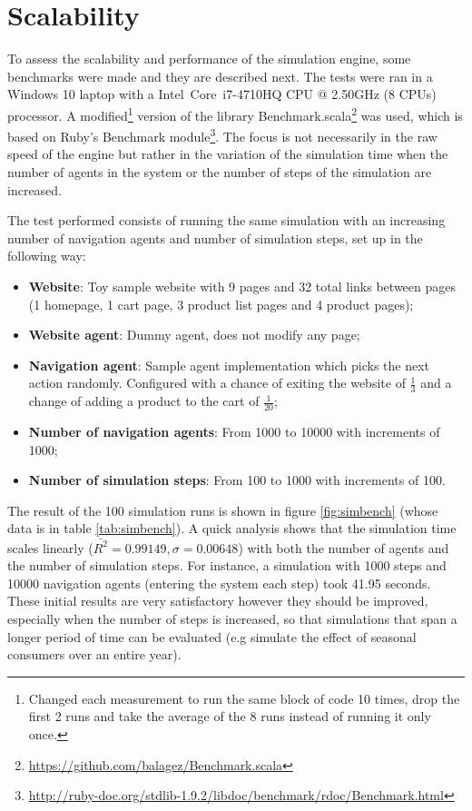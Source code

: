 \section{Scalability}\label{sec:scalability}

To assess the scalability and performance of the simulation engine, some 
benchmarks were made and they are described next. The tests were ran in a 
Windows 10 laptop with a Intel\textregistered~Core\texttrademark~i7-4710HQ CPU 
@ 2.50GHz (8 CPUs) processor. A modified\footnote{Changed each measurement to 
run the same block of code 10 times, drop the first 2 runs and take the average 
of the 8 runs instead of running it only once.} version of the library 
Benchmark.scala\footnote{\url{https://github.com/balagez/Benchmark.scala}} was 
used, which is based on Ruby's Benchmark 
module\footnote{\url{http://ruby-doc.org/stdlib-1.9.2/libdoc/benchmark/rdoc/Benchmark.html}}.
 The focus is not necessarily in the raw speed of the engine but rather in the 
variation of the simulation time when the number of agents in the system or the 
number of steps of the simulation are increased.

The test performed consists of running the same simulation with an 
increasing number of navigation agents and number of simulation steps, set up 
in the following way:

\begin{itemize}
    \item \textbf{Website}: Toy sample website with 9 pages and 32 total links 
    between pages (1 homepage, 1 cart page, 3 product list pages and 4 product 
    pages);
    \item \textbf{Website agent}: Dummy agent, does not modify any page;
    \item \textbf{Navigation agent}: Sample agent implementation which 
    picks the next action randomly. Configured with a chance of exiting the 
    website of $\frac{1}{3}$ and a change of adding a product to the cart of 
    $\frac{1}{20}$;
    \item \textbf{Number of navigation agents}: From 1000 to 10000 with 
    increments of 1000;
    \item \textbf{Number of simulation steps}: From 100 to 1000 with increments 
    of 100.
\end{itemize}

The result of the 100 simulation runs is shown in figure \ref{fig:simbench} 
(whose data is in table \ref{tab:simbench}). A quick analysis shows that the 
simulation time scales linearly ($\bar{R^{2}} = 0.99149, \sigma = 0.00648$) 
with both the number of agents and the number of simulation steps. For 
instance, a simulation with 1000 steps and 10000 navigation agents (entering 
the system each step)	 took 41.95 seconds. These initial results are very 
satisfactory however they should be improved, especially when the number of 
steps is increased, so that simulations that span a longer period of time can 
be evaluated (e.g simulate the effect of seasonal consumers over an entire 
year).

